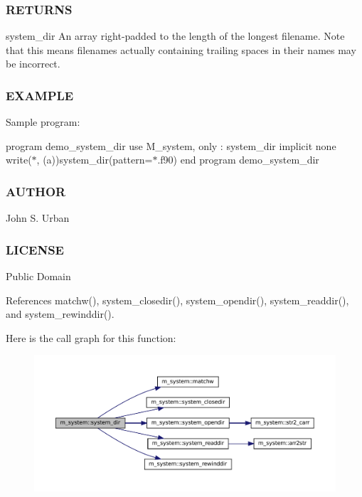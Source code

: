 \subsubsection*{R\+E\+T\+U\+R\+NS}

system\+\_\+dir An array right-\/padded to the length of the longest filename. Note that this means filenames actually containing trailing spaces in their names may be incorrect.

\subsubsection*{E\+X\+A\+M\+P\+LE}

Sample program\+:

program demo\+\_\+system\+\_\+dir use M\+\_\+system, only \+: system\+\_\+dir implicit none write($\ast$, \textquotesingle{}(a)\textquotesingle{})system\+\_\+dir(pattern=\textquotesingle{}$\ast$.f90\textquotesingle{}) end program demo\+\_\+system\+\_\+dir

\subsubsection*{A\+U\+T\+H\+OR}

John S. Urban

\subsubsection*{L\+I\+C\+E\+N\+SE}

Public Domain 

References matchw(), system\+\_\+closedir(), system\+\_\+opendir(), system\+\_\+readdir(), and system\+\_\+rewinddir().

Here is the call graph for this function\+:
\nopagebreak
\begin{figure}[H]
\begin{center}
\leavevmode
\includegraphics[width=350pt]{namespacem__system_a744f46033ef5e7ae95ec6cbff3ae3f89_cgraph}
\end{center}
\end{figure}
\mbox{\label{namespacem__system_a5a32db818a9ffb0a4ea724e95356c560}} 
